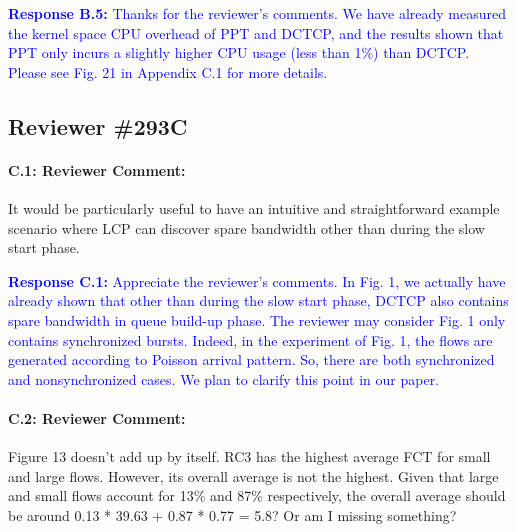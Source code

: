 \documentclass[12pt,one-column]{article}
\begin{document}
\noindent\textcolor{blue}{\textbf{Response B.5:}
Thanks for the reviewer’s comments. 
We have already measured the kernel space CPU overhead of PPT and DCTCP, and the results shown that PPT only incurs a slightly higher CPU usage (less than 1\%) than DCTCP. 
Please see Fig. 21 in Appendix C.1 for more details.
}

\subsection{Reviewer \#293C}
{\it \paragraph{C.1: Reviewer Comment:} It would be particularly useful to have an intuitive and straightforward example scenario where LCP can discover spare bandwidth other than during the slow start phase.}

\noindent\textcolor{blue}{\textbf{Response C.1:} 
Appreciate the reviewer’s comments. 
In Fig. 1, we actually have already shown that other than during the slow start phase, DCTCP also contains spare bandwidth in queue build-up phase. The reviewer may consider Fig. 1 only contains synchronized bursts. Indeed, in the experiment of Fig. 1, the flows are generated according to Poisson arrival  pattern. So, there are both synchronized and nonsynchronized cases. We plan to clarify this point in our paper.
}


{\it \paragraph{C.2: Reviewer Comment:} Figure 13 doesn’t add up by itself. RC3 has the highest average FCT for small and large flows. However, its overall average is not the highest. Given that large and small flows account for 13\% and 87\% respectively, the overall average should be around 0.13 * 39.63 + 0.87 * 0.77 = 5.8? Or am I missing something?}
\end{document}
